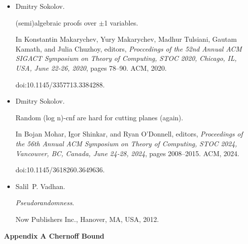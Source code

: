 \begin{itemize}
Nathan Segerlind, Samuel R. Buss, and Russell Impagliazzo.


A switching lemma for small restrictions and lower bounds for k-dnf
resolution.


\emph{SIAM J. Comput.}, 33(5):1171–1200, 2004.


doi:10.1137/S0097539703428555.





\item[] 
[36]

Dmitry Sokolov.


(semi)algebraic proofs over $\pm$1 variables.


In Konstantin Makarychev, Yury Makarychev, Madhur Tulsiani, Gautam
Kamath, and Julia Chuzhoy, editors, \emph{Proccedings of the 52nd Annual ACM
SIGACT Symposium on Theory of Computing, STOC 2020, Chicago, IL, USA,
June 22-26, 2020}, pages 78–90. ACM, 2020.


doi:10.1145/3357713.3384288.





\item[] 
[37]

Dmitry Sokolov.


Random (log n)-cnf are hard for cutting planes (again).


In Bojan Mohar, Igor Shinkar, and Ryan O’Donnell, editors, \emph{Proceedings of the 56th Annual ACM Symposium on Theory of Computing, STOC
2024, Vancouver, BC, Canada, June 24-28, 2024}, pages 2008–2015. ACM,
2024.


doi:10.1145/3618260.3649636.





\item[] 
[38]

Salil P. Vadhan.


\emph{Pseudorandomness}.


Now Publishers Inc., Hanover, MA, USA, 2012.





\end{itemize}




\par\medskip\noindent\textbf{
Appendix A Chernoff Bound}\par





